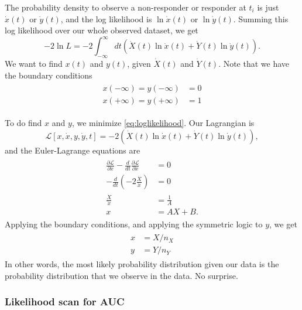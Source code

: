 \documentclass[11pt]{article}
\newcommand{\xdot}{\dot{x}}
\newcommand{\ydot}{\dot{y}}
\newcommand{\Xdot}{\dot{X}}
\newcommand{\Ydot}{\dot{Y}}
\begin{document}
The probability density to observe a non-responder or responder at \(t_i\) is just \(\xdot(t)\) or \(\ydot(t)\), and the log likelihood is \(\ln{\xdot(t)}\) or \(\ln{\ydot(t)}\).  Summing this log likelihood over our whole observed dataset, we get
\begin{equation}
	-2\ln{L}=-2\int_{-\infty}^{\infty}dt\left(\Xdot(t)\ln{\xdot(t)}+\Ydot(t)\ln{\ydot(t)}\right).
	\label{eq:loglikelihood}
\end{equation}
We want to find \(x(t)\) and \(y(t)\), given \(\Xdot(t)\) and \(\Ydot(t)\).  Note that we have the boundary conditions
\begin{align}
\begin{aligned}
	x(-\infty)=y(-\infty)&=0\\
	x(+\infty)=y(+\infty)&=1
\end{aligned}
\label{eq:boundaryconditions}
\end{align}

To do find \(x\) and \(y\), we minimize \cref{eq:loglikelihood}.  Our Lagrangian is
\begin{equation}
	\mathcal{L}[x,\xdot,y,\ydot,t]=-2\left(\Xdot(t)\ln{\xdot(t)}+\Ydot(t)\ln{\ydot(t)}\right),
	\label{eq:lagrangian}
\end{equation}
and the Euler-Lagrange equations are
\begin{align}
\begin{aligned}
	\frac{\partial\mathcal{L}}{\partial x}-\frac{d}{dt}\frac{\partial\mathcal{L}}{\partial \xdot}&=0 \\
	-\frac{d}{dt}\left(-2\frac{\Xdot}{\xdot}\right)&=0 \\
	\frac{\Xdot}{\xdot}&=\frac{1}{A} \\
	x&=AX+B.
\end{aligned}
\end{align}
Applying the boundary conditions, and applying the symmetric logic to \(y\), we get
\begin{align}
\begin{aligned}
	x&=X/n_X \\
	y&=Y/n_Y
\end{aligned}
\end{align}
In other words, the most likely probability distribution given our data is the probability distribution that we observe in the data.  No surprise.

\subsubsection{Likelihood scan for AUC}
\end{document}
